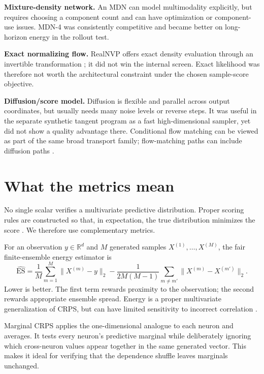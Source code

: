 \documentclass[11pt]{article}
\newcommand{\R}{\mathbb{R}}
\begin{document}
\textbf{Mixture-density network.} An MDN can model multimodality explicitly, but requires choosing a component count and can have optimization or component-use issues. MDN-4 was consistently competitive and became better on long-horizon energy in the rollout test.

\textbf{Exact normalizing flow.} RealNVP offers exact density evaluation through an invertible transformation \citep{dinh2017realnvp}; it did not win the internal screen. Exact likelihood was therefore not worth the architectural constraint under the chosen sample-score objective.

\textbf{Diffusion/score model.} Diffusion is flexible and parallel across output coordinates, but usually needs many noise levels or reverse steps. It was useful in the separate synthetic tangent program as a fast high-dimensional sampler, yet did not show a quality advantage there. Conditional flow matching can be viewed as part of the same broad transport family; flow-matching paths can include diffusion paths \citep{lipman2023flow}.

\section{What the metrics mean}

No single scalar verifies a multivariate predictive distribution. Proper scoring rules are constructed so that, in expectation, the true distribution minimizes the score \citep{gneiting2007proper}. We therefore use complementary metrics.

For an observation $y\in\R^d$ and $M$ generated samples $X^{(1)},\dots,X^{(M)}$, the fair finite-ensemble energy estimator is
\begin{equation}
 \widehat{\mathrm{ES}}
 =\frac{1}{M}\sum_{m=1}^{M}\|X^{(m)}-y\|_2
 -\frac{1}{2M(M-1)}\sum_{m\ne m'}\|X^{(m)}-X^{(m')}\|_2.
 \label{eq:energy}
\end{equation}
Lower is better. The first term rewards proximity to the observation; the second rewards appropriate ensemble spread. Energy is a proper multivariate generalization of CRPS, but can have limited sensitivity to incorrect correlation \citep{gneiting2007proper,scheuerer2015variogram}.

Marginal CRPS applies the one-dimensional analogue to each neuron and averages. It tests every neuron's predictive marginal while deliberately ignoring which cross-neuron values appear together in the same generated vector. This makes it ideal for verifying that the dependence shuffle leaves marginals unchanged.
\end{document}
